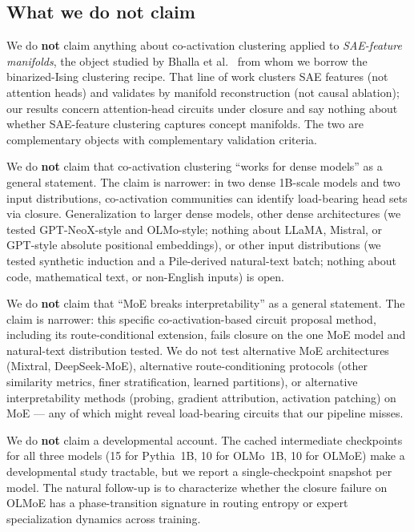 \documentclass[11pt]{article}
\begin{document}
\subsection{What we do not claim}

We do \textbf{not} claim anything about co-activation clustering applied
to \emph{SAE-feature manifolds}, the object studied by Bhalla et
al.~\cite{bhalla2026} from whom we borrow the binarized-Ising clustering
recipe. That line of work clusters SAE features (not attention heads) and
validates by manifold reconstruction (not causal ablation); our results
concern attention-head circuits under closure and say nothing about
whether SAE-feature clustering captures concept manifolds. The two are
complementary objects with complementary validation criteria.

We do \textbf{not} claim that co-activation clustering ``works for dense
models'' as a general statement. The claim is narrower: in two dense
1B-scale models and two input distributions, co-activation communities
can identify load-bearing head sets via closure. Generalization to larger
dense models, other dense architectures (we tested GPT-NeoX-style and
OLMo-style; nothing about LLaMA, Mistral, or GPT-style absolute positional
embeddings), or other input distributions (we tested synthetic induction
and a Pile-derived natural-text batch; nothing about code, mathematical
text, or non-English inputs) is open.

We do \textbf{not} claim that ``MoE breaks interpretability'' as a general
statement. The claim is narrower: this specific co-activation-based
circuit proposal method, including its route-conditional extension, fails
closure on the one MoE model and natural-text distribution tested. We do
not test alternative MoE architectures (Mixtral, DeepSeek-MoE), alternative
route-conditioning protocols (other similarity metrics, finer
stratification, learned partitions), or alternative interpretability
methods (probing, gradient attribution, activation patching) on MoE ---
any of which might reveal load-bearing circuits that our pipeline misses.

We do \textbf{not} claim a developmental account. The cached intermediate
checkpoints for all three models (15 for Pythia~1B, 10 for OLMo~1B, 10
for OLMoE) make a developmental study tractable, but we report a
single-checkpoint snapshot per model. The natural follow-up is to
characterize whether the closure failure on OLMoE has a phase-transition
signature in routing entropy or expert specialization dynamics across
training.
\end{document}
